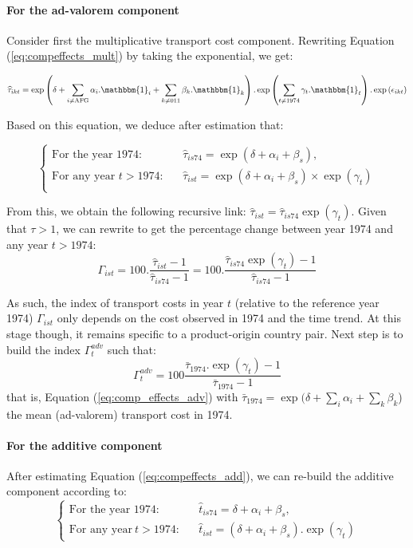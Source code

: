 \documentclass[a4paper,11pt]{article}
\begin{document}
\paragraph{For the ad-valorem component} Consider first the multiplicative transport cost component.
Rewriting Equation (\ref{eq:compeffects_mult}) by taking the exponential, we get:

\begin{equation*}
\widehat{\tau}_{ikt}=\exp\left(\delta + \sum_{i \neq \text{AFG}}\alpha_i.\mathbbm{1}_i+\sum_{k\neq \text{011}}\beta_k.\mathbbm{1}_k\right).\exp\left(\sum_{t \neq 1974}\gamma_t.\mathbbm{1}_t\right) .\exp\left(\epsilon_{ikt}\right)
\end{equation*}

Based on this equation, we deduce after estimation that:

\[\left\{
  \begin{array}{lcl}
  \text{For the year 1974:} &&  \widehat{\tau}_{is74} = \exp(\delta +\alpha_i+\beta_s), \\
  \text{For any year }t> 1974:&& \widehat{\tau}_{ist} = \exp(\delta +\alpha_i+\beta_s)\times \exp(\gamma_t) \\
  \end{array}
\right.\]

From this, we obtain the following recursive link: $\widehat{\tau}_{ist} = \widehat{\tau}_{is74}\exp(\gamma_t)$.
Given that $\tau >1$, we can rewrite to get the percentage change between year 1974 and any year $t>1974$:
\begin{equation*}
\Gamma_{ist} = 100.\frac{\widehat{\tau}_{ist}-1}{\widehat{\tau}_{is74}-1} = 100.\frac{\widehat{\tau}_{is74}\exp(\gamma_t)-1}{\widehat{\tau}_{is74}-1}
\end{equation*}

As such, the index of transport costs in year $t$ (relative to the reference year 1974) $\Gamma_{ist} $  only depends on the cost observed in 1974 and the time trend.
At this stage though, it remains specific to a product-origin country pair.
Next step is to build the index $\Gamma^{adv}_t$ such that:
\begin{equation}
 \Gamma^{adv}_t= 100\frac {\bar{\tau}_{1974}.\exp(\gamma_t)-1} {\bar{\tau}_{1974}-1}  \label{eq:tcadv_compoeffect}
\end{equation}
\noindent that is, Equation (\ref{eq:comp_effects_adv}) with $\bar{\tau}_{1974} = \exp(\delta + \sum_i \alpha_i + \sum_k \beta_k$) the mean (ad-valorem) transport cost in 1974.

\paragraph{For the additive component} After estimating Equation (\ref{eq:compeffects_add}), we can re-build the additive component according to:
\[\left\{
  \begin{array}{lcl}
\text{For the year 1974:}&&\widehat{t}_{is74}=  \delta + \alpha_i+ \beta_s, \\
\text{For any year}~t> 1974:&&\widehat{t}_{ist}=\left(\delta + \alpha_i+ \beta_s\right).\exp(\gamma_t)
\end{array}
\right.\]
\end{document}
